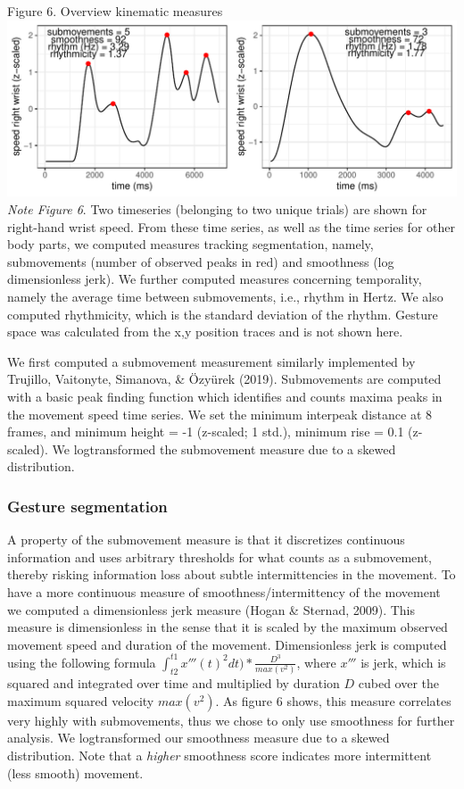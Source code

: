 \documentclass[
  man, noextraspace,floatsintext]{apa6}
\begin{document}
Figure 6. Overview kinematic measures
\includegraphics{GNet_WP_files/figure-latex/plotjerk-1.pdf}
\emph{Note Figure 6}. \small Two timeseries (belonging to two unique trials) are shown for right-hand wrist speed. From these time series, as well as the time series for other body parts, we computed measures tracking segmentation, namely, submovements (number of observed peaks in red) and smoothness (log dimensionless jerk). We further computed measures concerning temporality, namely the average time between submovements, i.e., rhythm in Hertz. We also computed rhythmicity, which is the standard deviation of the rhythm. Gesture space was calculated from the x,y position traces and is not shown here. \normalsize

We first computed a submovement measurement similarly implemented by Trujillo, Vaitonyte, Simanova, \& Özyürek (2019). Submovements are computed with a basic peak finding function which identifies and counts maxima peaks in the movement speed time series. We set the minimum interpeak distance at 8 frames, and minimum height = -1 (z-scaled; 1 std.), minimum rise = 0.1 (z-scaled). We logtransformed the submovement measure due to a skewed distribution.

\hypertarget{gesture-segmentation}{%
\subsubsection{Gesture segmentation}\label{gesture-segmentation}}

A property of the submovement measure is that it discretizes continuous information and uses arbitrary thresholds for what counts as a submovement, thereby risking information loss about subtle intermittencies in the movement. To have a more continuous measure of smoothness/intermittency of the movement we computed a dimensionless jerk measure (Hogan \& Sternad, 2009). This measure is dimensionless in the sense that it is scaled by the maximum observed movement speed and duration of the movement. Dimensionless jerk is computed using the following formula \(\int_{t2}^{t1} x''' (t)^{2}dt)* \frac{D^{3}}{max(v^{2})}\), where \(x'''\) is jerk, which is squared and integrated over time and multiplied by duration \(D\) cubed over the maximum squared velocity \(max(v^{2})\). As figure 6 shows, this measure correlates very highly with submovements, thus we chose to only use smoothness for further analysis. We logtransformed our smoothness measure due to a skewed distribution. Note that a \emph{higher} smoothness score indicates more intermittent (less smooth) movement.
\end{document}
